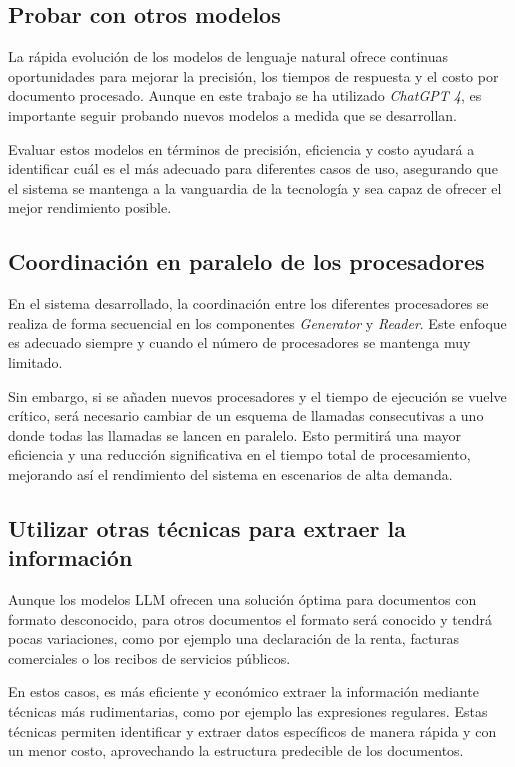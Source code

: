 \subsection*{Probar con otros modelos}

La rápida evolución de los modelos de lenguaje natural ofrece continuas oportunidades para mejorar la precisión, los
tiempos de respuesta y el costo por documento procesado.
Aunque en este trabajo se ha utilizado \textit{ChatGPT 4}, es importante seguir probando nuevos modelos a medida que se
desarrollan.

Evaluar estos modelos en términos de precisión, eficiencia y costo ayudará a identificar cuál es el más adecuado para
diferentes casos de uso, asegurando que el sistema se mantenga a la vanguardia de la tecnología y sea capaz de ofrecer
el mejor rendimiento posible.

\subsection*{Coordinación en paralelo de los procesadores}

En el sistema desarrollado, la coordinación entre los diferentes procesadores se realiza de forma secuencial en los
componentes \textit{Generator} y \textit{Reader}.
Este enfoque es adecuado siempre y cuando el número de procesadores se mantenga muy limitado.

Sin embargo, si se añaden nuevos procesadores y el tiempo de ejecución se vuelve crítico, será necesario cambiar de un
esquema de llamadas consecutivas a uno donde todas las llamadas se lancen en paralelo.
Esto permitirá una mayor eficiencia y una reducción significativa en el tiempo total de procesamiento, mejorando así el
rendimiento del sistema en escenarios de alta demanda.

\subsection*{Utilizar otras técnicas para extraer la información}

Aunque los modelos LLM ofrecen una solución óptima para documentos con formato desconocido, para otros documentos el
formato será conocido y tendrá pocas variaciones, como por ejemplo una declaración de la renta, facturas comerciales o
los recibos de servicios públicos.

En estos casos, es más eficiente y económico extraer la información mediante técnicas más rudimentarias, como por
ejemplo las expresiones regulares.
Estas técnicas permiten identificar y extraer datos específicos de manera rápida y con un menor costo, aprovechando la
estructura predecible de los documentos.

